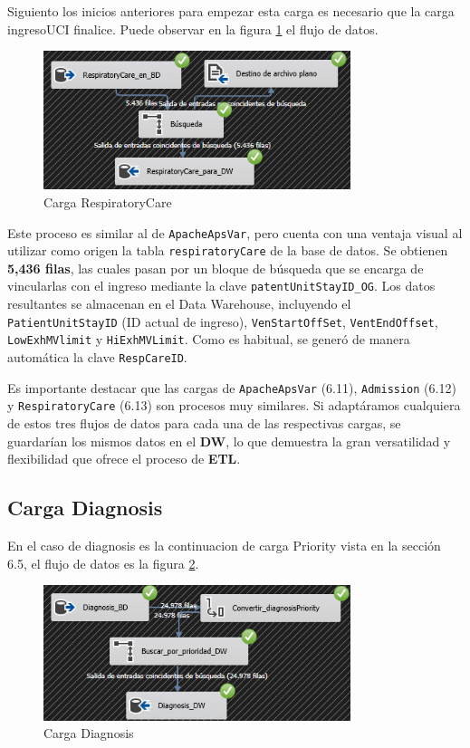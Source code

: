 \documentclass[12pt, a4paper, twoside]{article}
\begin{document}
	Siguiento los inicios anteriores para empezar esta carga es necesario que la carga ingresoUCI finalice. Puede observar en la figura \ref{fig:35} el flujo de datos.
	
	\begin{figure}[H]
		\centering
		\includegraphics[width=0.8\textwidth]{image/122_RespiratoryCare.png}
		\caption{Carga RespiratoryCare}
		\label{fig:35}
	\end{figure}
	
	Este proceso es similar al de \texttt{ApacheApsVar}, pero cuenta con una ventaja visual al utilizar como origen la tabla \texttt{respiratoryCare} de la base de datos. Se obtienen \textbf{5,436 filas}, las cuales pasan por un bloque de búsqueda que se encarga de vincularlas con el ingreso mediante la clave \texttt{patentUnitStayID\_OG}. Los datos resultantes se almacenan en el Data Warehouse, incluyendo el \texttt{PatientUnitStayID} (ID actual de ingreso), \texttt{VenStartOffSet}, \texttt{VentEndOffset}, \texttt{LowExhMVlimit} y \texttt{HiExhMVLimit}. Como es habitual, se generó de manera automática la clave \texttt{RespCareID}.
	
	Es importante destacar que las cargas de \texttt{ApacheApsVar} (6.11), \texttt{Admission} (6.12) y \texttt{RespiratoryCare} (6.13) son procesos muy similares. Si adaptáramos cualquiera de estos tres flujos de datos para cada una de las respectivas cargas, se guardarían los mismos datos en el \textbf{DW}, lo que demuestra la gran versatilidad y flexibilidad que ofrece el proceso de \textbf{ETL}.
	
	
	\subsection{Carga Diagnosis}
	
	En el caso de diagnosis es la continuacion de carga Priority vista en la sección 6.5, el flujo de datos es la figura \ref{fig:21}.
	
	\begin{figure}[H]
		\centering
		\includegraphics[width=0.8\textwidth]{image/112_carga_diagnosis.png}
		\caption{Carga Diagnosis}
		\label{fig:21}
	\end{figure}
	
\end{document}
